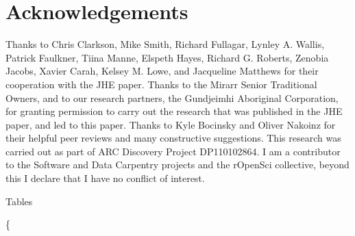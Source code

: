 \documentclass[american,man]{apa6}
\begin{document}
\section{Acknowledgements}\label{acknowledgements}

Thanks to Chris Clarkson, Mike Smith, Richard Fullagar, Lynley A.
Wallis, Patrick Faulkner, Tiina Manne, Elspeth Hayes, Richard G.
Roberts, Zenobia Jacobs, Xavier Carah, Kelsey M. Lowe, and Jacqueline
Matthews for their cooperation with the JHE paper. Thanks to the Mirarr
Senior Traditional Owners, and to our research partners, the Gundjeimhi
Aboriginal Corporation, for granting permission to carry out the
research that was published in the JHE paper, and led to this paper.
Thanks to Kyle Bocinsky and Oliver Nakoinz for their helpful peer
reviews and many constructive suggestions. This research was carried out
as part of ARC Discovery Project DP110102864. I am a contributor to the
Software and Data Carpentry projects and the rOpenSci collective, beyond
this I declare that I have no conflict of interest.

\newpage

\clearpage

\newpage

Tables

\{\fontsize{8pt}{8pt}\selectfont
\end{document}
